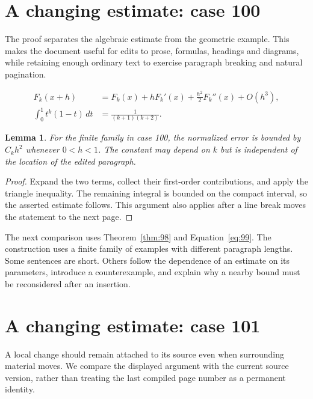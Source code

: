 \documentclass[a4paper,10pt]{article}
\newtheorem{lemma}[theorem]{Lemma}
\begin{document}
\lipsum[18]

\section{A changing estimate: case 100}\label{unit:99}
The proof separates the algebraic estimate from the geometric example. This makes the document useful for edits to prose, formulas, headings and diagrams, while retaining enough ordinary text to exercise paragraph breaking and natural pagination.

\lipsum[28-29]
\begin{align}\label{eq:99}
 F_k(x+h)&=F_k(x)+hF_k'(x)+\frac{h^2}{2}F_k''(x)+O(h^3),\\
 \int_0^1 t^k(1-t)\,dt&=\frac{1}{(k+1)(k+2)}.
\end{align}
\begin{lemma}\label{thm:99}
For the finite family in case 100, the normalized error is bounded by $C_k h^2$ whenever $0<h<1$. The constant may depend on $k$ but is independent of the location of the edited paragraph.
\end{lemma}
\begin{proof}
Expand the two terms, collect their first-order contributions, and apply the
triangle inequality. The remaining integral is bounded on the compact interval,
so the asserted estimate follows. This argument also applies after a line break
moves the statement to the next page.
\end{proof}
\begin{center}
\end{center}
The next comparison uses Theorem~\ref{thm:98} and Equation~\ref{eq:99}. The construction uses a finite family of examples with different paragraph lengths. Some sentences are short. Others follow the dependence of an estimate on its parameters, introduce a counterexample, and explain why a nearby bound must be reconsidered after an insertion.

\lipsum[23]

\section{A changing estimate: case 101}\label{unit:100}
A local change should remain attached to its source even when surrounding material moves. We compare the displayed argument with the current source version, rather than treating the last compiled page number as a permanent identity.
\end{document}
